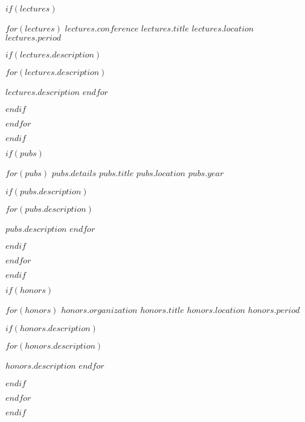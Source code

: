 \documentclass[12pt, letterpaper]{awesome-cv}
\begin{document}
$if(lectures)$
  \begin{cventries}

    $for(lectures)$
      \cventry
      {$lectures.conference$}
      {$lectures.title$}
      {$lectures.location$}
      {$lectures.period$}
      {
        $if(lectures.description)$
          \begin{cvitems}
            $for(lectures.description)$
              \item{$lectures.description$}
            $endfor$
          \end{cvitems}
        $endif$
      }

    $endfor$
  \end{cventries}
$endif$

$if(pubs)$
  \begin{cventries}

    $for(pubs)$
      \cventry
      {$pubs.details$}
      {$pubs.title$}
      {$pubs.location$}
      {$pubs.year$}
      {
        $if(pubs.description)$
          \begin{cvitems}
            $for(pubs.description)$
              \item{$pubs.description$}
            $endfor$
          \end{cvitems}
        $endif$
      }

    $endfor$
  \end{cventries}
$endif$


$if(honors)$
  \begin{cventries}

    $for(honors)$
      \cventry
      {$honors.organization$}
      {$honors.title$}
      {$honors.location$}
      {$honors.period$}
      {
        $if(honors.description)$
          \begin{cvitems}
            $for(honors.description)$
              \item{$honors.description$}
            $endfor$
          \end{cvitems}
        $endif$
      }

    $endfor$
  \end{cventries}
$endif$
\end{document}
